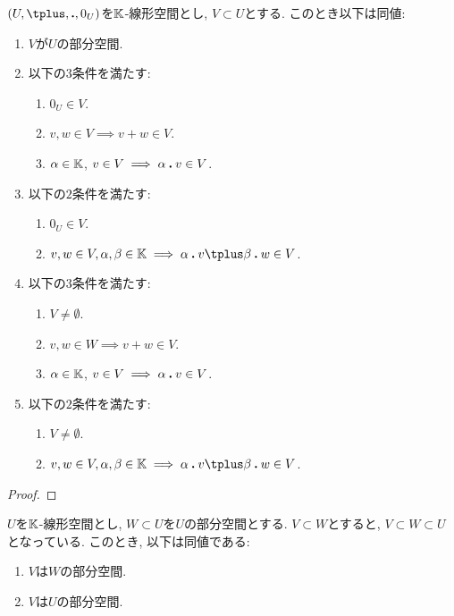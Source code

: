 \begin{lemma}
  $(U,\plus ,\act,0_U)$を$\mathbb{K}$-線形空間とし, $V\subset U$とする.
  このとき以下は同値:
  \begin{enumerate}
  \item $V$が$U$の部分空間.
  \item 以下の$3$条件を満たす:
    \begin{enumerate}
  \item $0_U\in V$.
  \item $v,w\in V \implies v\plus w\in V$.
  \item $\alpha\in\mathbb{K}$, $v\in V \implies \alpha\mathbin{\boldsymbol{.}} v\in V$.
    \end{enumerate}
  \item 以下の$2$条件を満たす:
    \begin{enumerate}
  \item $0_U\in V$.
  \item $v,w\in V, \alpha,\beta\in\KK \implies \alpha\act v\plus \beta\act w\in V$.
    \end{enumerate}
  \item 以下の$3$条件を満たす:
    \begin{enumerate}
  \item $V\neq \emptyset$.
  \item $v,w\in W \implies v\plus w\in V$.
  \item $\alpha\in\mathbb{K}$, $v\in V \implies \alpha\mathbin{\boldsymbol{.}} v\in V$.
    \end{enumerate}
  \item 以下の$2$条件を満たす:
    \begin{enumerate}
  \item $V\neq \emptyset$.
  \item $v,w\in V, \alpha,\beta\in\KK \implies \alpha\act v\plus \beta\act w\in V$.
    \end{enumerate}
  \end{enumerate}
\end{lemma}
\begin{proof}\end{proof}

\begin{remark}
$U$を$\mathbb{K}$-線形空間とし,
$W\subset U$を$U$の部分空間とする.
$V\subset W$とすると,
$V\subset W\subset U$となっている.
このとき, 以下は同値である:
\begin{enumerate}
\item $V$は$W$の部分空間.
\item $V$は$U$の部分空間.
\end{enumerate}
\end{remark}
